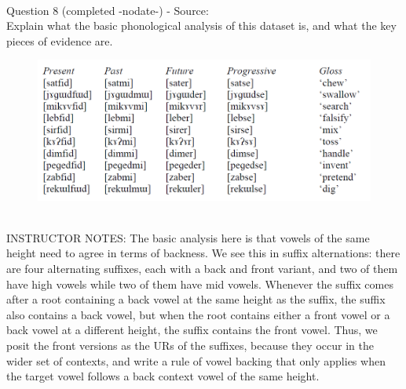 \documentclass[12pt]{article}
\begin{document}
~\\

{\large Question 8} (completed -nodate-) - Source: \\

Explain what the basic phonological analysis of this dataset is, and what the key pieces of evidence are.\\

\begin{figure}[H]
\includegraphics{../images/final_dataset.png}
\end{figure}

~\\
INSTRUCTOR NOTES: The basic analysis here is that vowels of the same height need to agree in terms of backness. We see this in suffix alternations: there are four alternating suffixes, each with a back and front variant, and two of them have high vowels while two of them have mid vowels. Whenever the suffix comes after a root containing a back vowel at the same height as the suffix, the suffix also contains a back vowel, but when the root contains either a front vowel or a back vowel at a different height, the suffix contains the front vowel. Thus, we posit the front versions as the URs of the suffixes, because they occur in the wider set of contexts, and write a rule of vowel backing that only applies when the target vowel follows a back context vowel of the same height.


\newpage
\end{document}
